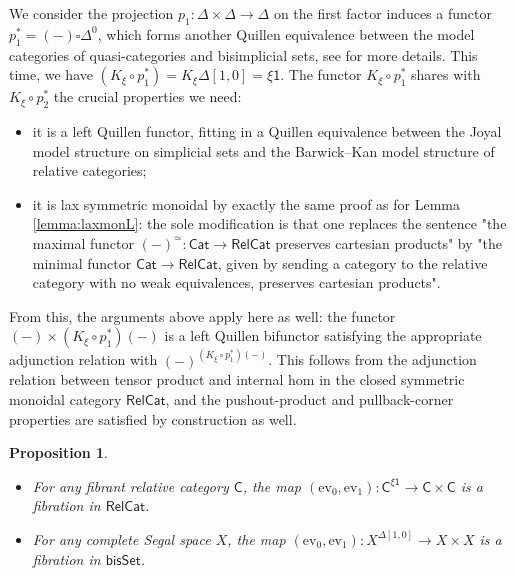 \documentclass[a4paper,12pt]{amsart}
\theoremstyle{plain}
\newtheorem{proposition}[theorem]{Proposition}%
\theoremstyle{definition}
\theoremstyle{remark}
\begin{document}
We consider the projection $p_1:\Delta\times\Delta\rightarrow\Delta$ on the first factor induces a functor $p_1^*=(-)\square\Delta^0$, which forms another Quillen equivalence between the model categories of quasi-categories and bisimplicial sets, see \cite{JoaylTierney07} for more details. This time, we have $(K_{\xi}\circ p_1^*)=K_{\xi}\Delta[1,0] = \xi\mathsf{1}$. The functor $K_{\xi}\circ p_1^*$ shares with $K_{\xi}\circ p_2^*$ the crucial properties we need:
\begin{itemize}
\item[$\bullet$] it is a left Quillen functor, fitting in a Quillen equivalence between the Joyal model structure on simplicial sets and the Barwick--Kan model structure of relative categories;

\item[$\bullet$] it is lax symmetric monoidal by exactly the same proof as for Lemma \ref{lemma:laxmonL}: the sole modification is that one replaces the sentence "the maximal functor $(-)^{\simeq}: \mathsf{Cat} \longrightarrow \mathsf{RelCat}$ preserves cartesian products" by "the minimal functor $\mathsf{Cat} \longrightarrow \mathsf{RelCat}$, given by sending a category to the relative category with no weak equivalences, preserves cartesian products".
\end{itemize}

From this, the arguments above apply here as well: the functor $(-)\times (K_{\xi}\circ p_1^*)(-)$ is a left Quillen bifunctor satisfying the appropriate adjunction relation with $(-)^{(K_{\xi}\circ p_1^*)(-)}$. This follows from the adjunction relation between tensor product and internal hom in the closed symmetric monoidal category $\mathsf{RelCat}$, and the pushout-product and pullback-corner properties are satisfied by construction as well.

\begin{proposition}\label{prop: evaluationfibrations}\leavevmode
\begin{itemize}
\item[(1)] For any fibrant relative category $\mathsf{C}$, the map  $(\mathrm{ev}_0,\mathrm{ev}_1):\mathsf{C}^{\xi\mathsf{1}}\rightarrow \mathsf{C}\times \mathsf{C}$ is a fibration in $\mathsf{RelCat}$.

\item[(2)] For any complete Segal space $X$, the map  $(\mathrm{ev}_0,\mathrm{ev}_1):X^{\Delta[1,0]}\rightarrow X\times X$ is a fibration in $\mathsf{bisSet}$.
\end{itemize}
\end{proposition}
\end{document}
